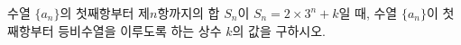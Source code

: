 수열 $\{a_n\}$의 첫째항부터 제$n$항까지의 합 $S_n$이 $S_n=2\times 3^n+k$일 때, 수열 $\{a_n\}$이 첫째항부터 등비수열을 이루도록 하는 상수 $k$의 값을 구하시오.
